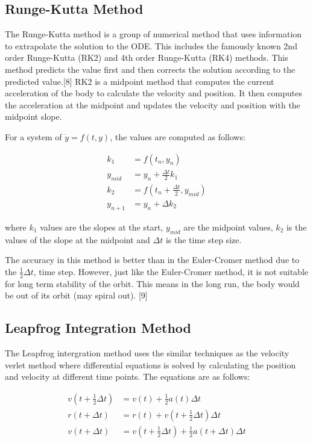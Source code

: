 \documentclass[11 pt, a4paper]{article}
\begin{document}
\subsection{Runge-Kutta Method}
The Runge-Kutta method is a group of numerical method that uses information to extrapolate the solution to the ODE. This includes the famously
known 2nd order Runge-Kutta (RK2) and 4th order Runge-Kutta (RK4) methods. This method predicts the value first and then corrects the 
solution according to the predicted value.[8] RK2 is a midpoint method that computes the current acceleration of the body to calculate the 
velocity and position. It then computes the acceleration at the midpoint and updates the velocity and position with the midpoint slope.

For a system of $\dot{y} = f(t,y)$, the values are computed as follows:

\begin{align}
k_1 &= f(t_n, y_n) \tag{Eq. 9a} \\
y_{mid} &= y_n + \frac{\Delta t}{2}k_1 \tag{9b} \\
k_2 &= f(t_n + \frac{\Delta t}{2}, y_{mid}) \tag{9c} \\
y_{n+1} &= y_n + \Delta k_2 \tag{9d}
\end{align}

where $k_1$ values are the slopes at the start, $y_{mid}$ are the midpoint values, $k_2$ is the values of the slope at the midpoint 
and $\Delta t$ is the time step size.

The accuracy in this method is better than in the Euler-Cromer method due to the $\frac{1}{2}\Delta t$, time step. However, just like 
the Euler-Cromer method, it is not suitable for long term stability of the orbit. This means in the long run, the body would be out of its 
orbit (may spiral out). [9]

\subsection{Leapfrog Integration Method}
The Leapfrog intergration method uses the similar techniques as the velocity verlet method where differential equations is solved by calculating the
position and velocity at different time points. The equations are as follows:

\begin{align}
v(t +\frac{1}{2}\Delta t) &= v(t) + \frac{1}{2}a(t)\Delta t \tag{Eq. 10a} \\
r(t + \Delta t) &= r(t) + v(t +\frac{1}{2}\Delta t)\Delta t \tag{10b} \\
v(t +\Delta t) &= v(t +\frac{1}{2}\Delta t) + \frac{1}{2}a(t + \Delta t)\Delta t \tag{10c}
\end{align}
\end{document}
